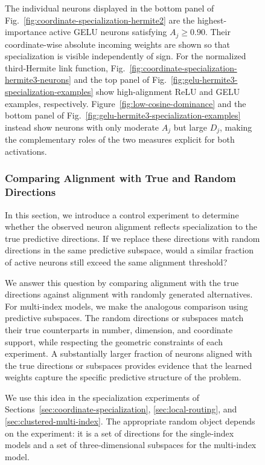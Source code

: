 \documentclass{article}
\newcounter{model}[section]
\begin{document}
\begin{figure}
The individual neurons displayed in the bottom panel of
Fig.~\ref{fig:coordinate-specialization-hermite2} are the
highest-importance active GELU neurons satisfying \(A_j\geq0.90\). Their
coordinate-wise absolute incoming weights are shown so that specialization is
visible independently of sign. For the normalized third-Hermite link function,
Fig.~\ref{fig:coordinate-specialization-hermite3-neurons} and the top panel of
Fig.~\ref{fig:gelu-hermite3-specialization-examples} show high-alignment ReLU
and GELU examples, respectively. Figure~\ref{fig:low-cosine-dominance} and the
bottom panel of Fig.~\ref{fig:gelu-hermite3-specialization-examples} instead
show neurons with only moderate \(A_j\) but large \(D_j\), making the
complementary roles of the two measures explicit for both activations.

\subsubsection{Comparing Alignment with True and Random Directions}
\label{app:specialization-null}

In this section, we introduce a control experiment to determine whether the
observed neuron alignment reflects specialization to the true predictive
directions. If we replace these directions with random directions in the same
predictive subspace, would a similar fraction of active neurons still exceed
the same alignment threshold?

We answer this question by comparing alignment
with the true directions against alignment with randomly generated
alternatives. For multi-index models, we make the analogous comparison using
predictive subspaces. The random directions or subspaces match their true
counterparts in number, dimension, and coordinate support, while respecting
the geometric constraints of each experiment. A substantially larger fraction
of neurons aligned with the true directions or subspaces provides evidence
that the learned weights capture the specific predictive structure of the
problem.

We use this idea in the specialization experiments of
Sections~\ref{sec:coordinate-specialization}, \ref{sec:local-routing}, and
\ref{sec:clustered-multi-index}. The appropriate random object depends on the
experiment: it is a set of directions for the single-index models and a set
of three-dimensional subspaces for the multi-index model.


\end{figure}
\end{document}
